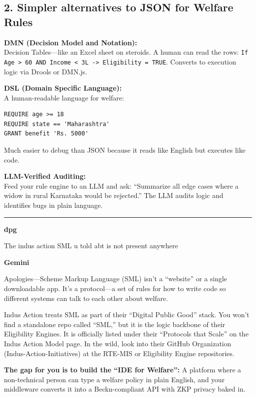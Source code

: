 \documentclass[11pt,a4paper]{article}
\begin{document}
\subsection*{2. Simpler alternatives to JSON for Welfare Rules}

\textbf{DMN (Decision Model and Notation):}\\
Decision Tables---like an Excel sheet on steroids. A human can read the rows: \texttt{If Age > 60 AND Income < 3L -> Eligibility = TRUE}. Converts to execution logic via Drools or DMN.js.

\textbf{DSL (Domain Specific Language):}\\
A human-readable language for welfare:
\begin{lstlisting}
REQUIRE age >= 18
REQUIRE state == 'Maharashtra'
GRANT benefit 'Rs. 5000'
\end{lstlisting}
Much easier to debug than JSON because it reads like English but executes like code.

\textbf{LLM-Verified Auditing:}\\
Feed your rule engine to an LLM and ask: ``Summarize all edge cases where a widow in rural Karnataka would be rejected.'' The LLM audits logic and identifies bugs in plain language.

\bigskip
\hrule
\bigskip


{\small\color{primary}\textbf{dpg}}
\begin{mebox}
The indus action SML u told abt is not present anywhere
\end{mebox}

{\small\color{secondary}\textbf{Gemini}}\vspace{2pt}

Apologies---Scheme Markup Language (SML) isn't a ``website'' or a single downloadable app. It's a protocol---a set of rules for how to write code so different systems can talk to each other about welfare.

Indus Action treats SML as part of their ``Digital Public Good'' stack. You won't find a standalone repo called ``SML,'' but it is the logic backbone of their Eligibility Engines. It is officially listed under their ``Protocols that Scale'' on the Indus Action Model page. In the wild, look into their GitHub Organization (Indus-Action-Initiatives) at the RTE-MIS or Eligibility Engine repositories.

\textbf{The gap for you is to build the ``IDE for Welfare'':} A platform where a non-technical person can type a welfare policy in plain English, and your middleware converts it into a Beckn-compliant API with ZKP privacy baked in.
\end{document}
